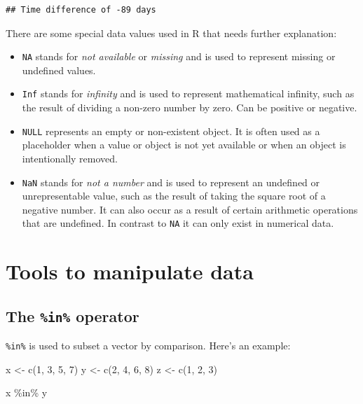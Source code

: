 \documentclass[
  12pt,
  oneside]{book}
\newenvironment{Shaded}{\begin{snugshade}}{\end{snugshade}}
\newcommand{\DecValTok}[1]{\textcolor[rgb]{0.00,0.00,0.81}{#1}}
\newcommand{\FunctionTok}[1]{\textcolor[rgb]{0.00,0.00,0.00}{#1}}
\newcommand{\NormalTok}[1]{#1}
\newcommand{\OtherTok}[1]{\textcolor[rgb]{0.56,0.35,0.01}{#1}}
\newcommand{\SpecialCharTok}[1]{\textcolor[rgb]{0.00,0.00,0.00}{#1}}
\providecommand{\tightlist}{%
  \setlength{\itemsep}{0pt}\setlength{\parskip}{0pt}}
\theoremstyle{definition}
\theoremstyle{definition}
\theoremstyle{definition}
\theoremstyle{definition}
\theoremstyle{remark}
\begin{document}
\begin{verbatim}
## Time difference of -89 days
\end{verbatim}

There are some special data values used in R that needs further explanation:

\begin{itemize}
\tightlist
\item
  \texttt{NA} stands for \emph{not available} or \emph{missing} and is used to represent missing or undefined values.
\item
  \texttt{Inf} stands for \emph{infinity} and is used to represent mathematical infinity, such as the result of dividing a non-zero number by zero. Can be positive or negative.\\
\item
  \texttt{NULL} represents an empty or non-existent object. It is often used as a placeholder when a value or object is not yet available or when an object is intentionally removed.
\item
  \texttt{NaN} stands for \emph{not a number} and is used to represent an undefined or unrepresentable value, such as the result of taking the square root of a negative number. It can also occur as a result of certain arithmetic operations that are undefined. In contrast to \texttt{NA} it can only exist in numerical data.
\end{itemize}

\hypertarget{tools-to-manipulate-data}{%
\section{Tools to manipulate data}\label{tools-to-manipulate-data}}

\hypertarget{the-in-operator}{%
\subsection{\texorpdfstring{The \texttt{\%in\%} operator}{The \%in\% operator}}\label{the-in-operator}}

\texttt{\%in\%} is used to subset a vector by comparison. Here's an example:

\begin{Shaded}
\begin{Highlighting}[]
\NormalTok{x }\OtherTok{\textless{}{-}} \FunctionTok{c}\NormalTok{(}\DecValTok{1}\NormalTok{, }\DecValTok{3}\NormalTok{, }\DecValTok{5}\NormalTok{, }\DecValTok{7}\NormalTok{)}
\NormalTok{y }\OtherTok{\textless{}{-}} \FunctionTok{c}\NormalTok{(}\DecValTok{2}\NormalTok{, }\DecValTok{4}\NormalTok{, }\DecValTok{6}\NormalTok{, }\DecValTok{8}\NormalTok{)}
\NormalTok{z }\OtherTok{\textless{}{-}} \FunctionTok{c}\NormalTok{(}\DecValTok{1}\NormalTok{, }\DecValTok{2}\NormalTok{, }\DecValTok{3}\NormalTok{)}

\NormalTok{x }\SpecialCharTok{\%in\%}\NormalTok{ y  }
\end{Highlighting}
\end{Shaded}
\end{document}

